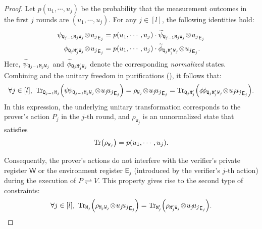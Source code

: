 \documentclass[11pt, a4paper]{article}
\numberwithin{equation}{section}
\numberwithin{figure}{section}
\newcommand{\protocol}[2]{{#1}\!\rightleftharpoons\!{#2}}
\DeclarePairedDelimiter\rbra{\lparen}{\rparen}
\let\ket\relax\DeclarePairedDelimiter\ket{\lvert}{\rangle}
\let\bra\relax\DeclarePairedDelimiter\bra{\langle}{\rvert}
\newcommand{\ketbra}[2]{\ensuremath{\ket{#1}\!\bra{#2}}}
\newcommand{\Tr}{\mathrm{Tr}}
\newcommand{\sfE}{\mathsf{E}}
\newcommand{\sfW}{\mathsf{W}}
\newcommand{\ttM}{\mathtt{M}}
\newcommand{\ttQ}{\mathtt{Q}}
\newcommand{\ttW}{\mathtt{W}}
\begin{document}
\begin{proof}
    Let $p(u_1,\cdots,u_j)$ be the probability that the measurement outcomes in the first $j$ rounds are $(u_1,\cdots,u_j)$. For any $j \in [l]$, the following identities hold: 
    \begin{equation}
    \label{eq:branch-normalization-factor}
    \begin{aligned}
        \ket{\psi}_{\ttQ_{j-1}\ttM_j\ttW_j} \!\otimes\! \ket{u_j}_{\sfE_j} &= p(u_1,\cdots,u_j) \cdot \ket{\widetilde{\psi}}_{\ttQ_{j-1}\ttM_j\ttW_j} \!\otimes\! \ket{u_j}_{\sfE_j}\\
        \ket{\phi}_{\ttQ_{j}\ttM'_j\ttW_j} \!\otimes\! \ket{u_j}_{\sfE_j} &= p(u_1,\cdots,u_j) \cdot \ket{\widetilde{\phi}}_{\ttQ_{j}\ttM'_j\ttW_j} \!\otimes\! \ket{u_j}_{\sfE_j}. 
    \end{aligned}
    \end{equation}
    Here, $\ket{\widetilde{\psi}}_{\ttQ_{j-1}\ttM_j\ttW_j}$ and $\ket{\widetilde{\phi}}_{\ttQ_{j}\ttM'_j\ttW_j}$ denote the corresponding \textit{normalized} states.     
    Combining  and
    the unitary freedom in purifications (), it follows that:
    \begin{equation*}
        \forall j \in [l],~\Tr_{\ttQ_{j-1}\ttM_j}\rbra*{\ketbra{\psi}{\psi}_{\ttQ_{j-1}\ttM_j\ttW_j} \!\otimes\! \ketbra{u_j}{u_j}_{\sfE_j}} = \rho_{\ttW_j} \!\otimes\! \ketbra{u_j}{u_j}_{\sfE_j}  = \Tr_{\ttQ_{j}\ttM'_j}\rbra*{\ketbra{\phi}{\phi}_{\ttQ_{j}\ttM'_j\ttW_j} \!\otimes\! \ketbra{u_j}{u_j}_{\sfE_j}}.
    \end{equation*}
    In this expression, the underlying unitary transformation corresponds to the prover's action $P_j$ in the $j$-th round, and $\rho_{\ttW_j}$ is an unnormalized state that satisfies 
    \begin{equation}
        \label{eq:branch-prob}
        \Tr\rbra[\big]{\rho_{\ttW_j}} = p(u_1,\cdots,u_j).
    \end{equation}
    
    Consequently, the prover's actions do not interfere with the verifier's private register $\sfW$ or the environment register $\sfE_j$ (introduced by the verifier's $j$-th action) during the execution of $\protocol{P}{V}$. This property gives rise to the second type of constraints: 
    \begin{equation}
        \label{eq:QIPL-prover-actions-cond}
        \forall j \in [l],~\Tr_{\ttM_j}\rbra*{\rho_{\ttM_j\ttW_j} \!\otimes\! \ketbra{u_j}{u_j}_{\sfE_j}} = \Tr_{\ttM'_j}\rbra*{\rho_{\ttM'_j\ttW_j} \!\otimes\! \ketbra{u_j}{u_j}_{\sfE_j}}.
    \end{equation}


\end{proof}
\end{document}
